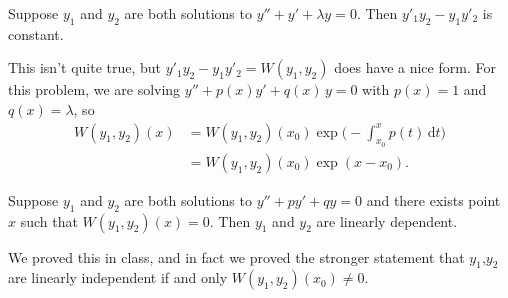 \documentclass{homework}
\begin{document}
\begin{problem}Suppose $y_1$ and $y_2$ are both solutions to
  $y'' + y' + \lambda y = 0$.  Then $y'_1 y_2 - y_1 y'_2$ is constant.
\end{problem}

\begin{solution}
  This isn't quite true, but $y'_1 y_2 - y_1 y'_2 = W(y_1,y_2)$ does
  have a nice form.  For this problem, we are solving $y'' + p(x)y' + q(x)\,y = 0$ with $p(x) = 1$ and $q(x) = \lambda$, so 
  \begin{align*}
    \displaystyle W(y_{1},y_{2})(x)&=W(y_{1},y_{2})(x_{0})\exp {\biggl (}-\int _{x_{0}}^{x}p(t)\,{\textrm {d}}t{\biggr )} \\
    &=W(y_{1},y_{2})(x_{0})\exp (x - x_0).
    \end{align*}
\end{solution}

\begin{problem}
  Suppose $y_1$ and $y_2$ are both solutions to
  $y'' + p y' + q y = 0$ and there exists point $x$ such that $W(y_1,y_2)(x) = 0$.  Then $y_1$ and $y_2$ are linearly dependent.
\end{problem}

\begin{solution}
  We proved this in class, and in fact we proved the stronger
  statement that $y_1$,$y_2$ are linearly independent if and only
  $W(y_1,y_2)(x_0) \neq 0$.
\end{solution}
\end{document}
